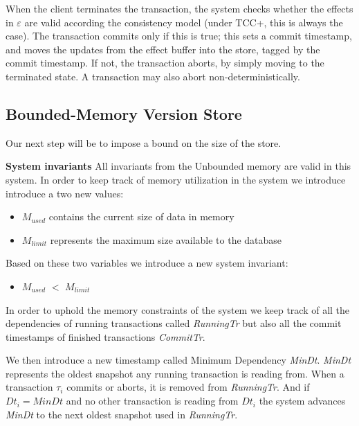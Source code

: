 \documentclass[systeme,french,english]{compas2022}
\newcommand{\commentaire}[2][fromWhom?]{%
  {%
    \color{magenta}{\bfseries\sffamily\scriptsize$\triangleright$(#1:) #2$\triangleleft$}%
  }}
\begin{document}
When the client terminates the transaction, the system checks whether
the effects in $\varepsilon$ are valid according the consistency model
(under TCC+, this is always the case).
The transaction commits only if this is true; this sets a commit
timestamp, and moves the updates
from the effect buffer into the store, tagged by the commit timestamp.
\commentaire[Marc]{D'après le modèle le tag serait l'ID de transaction.}
If not, the transaction aborts, by simply moving to the terminated
state.
A transaction may also abort non-deterministically.

\subsection{Bounded-Memory Version Store}

Our next step will be to impose a bound on the size of the store.

\commentaire[Marc]{Stopped here **** 2022-04-16 10:40}

\textbf{System invariants}
All invariants from the Unbounded memory are valid in this system.
In order to keep track of memory utilization in the system we introduce introduce a two new values:
\begin{itemize}
  \item \emph{$M_{used}$} contains the current size of data in memory
  \item \emph{$M_{limit}$} represents the maximum size available to the database
\end{itemize}
Based on these two variables we introduce a new system invariant:
\begin{itemize}
  \item \emph{$M_{used}$} $<$ \emph{$M_{limit}$}
\end{itemize}
In order to uphold the memory constraints of the system we keep track of all the dependencies of running transactions called \emph{RunningTr} but also all the commit timestamps of finished transactions \emph{CommitTr}.

We then introduce a new timestamp called Minimum Dependency \emph{MinDt}.
\emph{MinDt} represents the oldest snapshot any running transaction is reading from.
When a transaction $\tau_i$ commits or aborts, it is removed from \emph{RunningTr}. 
And if $Dt_i = MinDt$ and no other transaction is reading from $Dt_i$ the system advances \emph{MinDt} to the next oldest snapshot used in \emph{RunningTr}.
\end{document}
